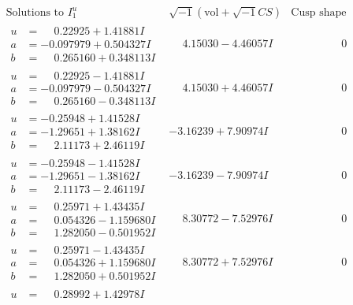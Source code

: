 \documentclass[1p]{elsarticle_modified}
\theoremstyle{definition}
\newcommand{\I}{\sqrt{-1}}
\begin{document}
$$\begin{array}{c|c|c}
\text{Solutions to }I^u_{1}& \I (\text{vol} + \sqrt{-1}CS) & \text{Cusp shape}\\
 \hline 
\begin{aligned}
u &= \phantom{-}0.22925 + 1.41881 I \\
a &= -0.097979 + 0.504327 I \\
b &= \phantom{-}0.265160 + 0.348113 I\end{aligned}
 & \phantom{-}4.15030 - 4.46057 I & \phantom{-0.000000 } 0 \\ \hline\begin{aligned}
u &= \phantom{-}0.22925 - 1.41881 I \\
a &= -0.097979 - 0.504327 I \\
b &= \phantom{-}0.265160 - 0.348113 I\end{aligned}
 & \phantom{-}4.15030 + 4.46057 I & \phantom{-0.000000 } 0 \\ \hline\begin{aligned}
u &= -0.25948 + 1.41528 I \\
a &= -1.29651 + 1.38162 I \\
b &= \phantom{-}2.11173 + 2.46119 I\end{aligned}
 & -3.16239 + 7.90974 I & \phantom{-0.000000 } 0 \\ \hline\begin{aligned}
u &= -0.25948 - 1.41528 I \\
a &= -1.29651 - 1.38162 I \\
b &= \phantom{-}2.11173 - 2.46119 I\end{aligned}
 & -3.16239 - 7.90974 I & \phantom{-0.000000 } 0 \\ \hline\begin{aligned}
u &= \phantom{-}0.25971 + 1.43435 I \\
a &= \phantom{-}0.054326 - 1.159680 I \\
b &= \phantom{-}1.282050 - 0.501952 I\end{aligned}
 & \phantom{-}8.30772 - 7.52976 I & \phantom{-0.000000 } 0 \\ \hline\begin{aligned}
u &= \phantom{-}0.25971 - 1.43435 I \\
a &= \phantom{-}0.054326 + 1.159680 I \\
b &= \phantom{-}1.282050 + 0.501952 I\end{aligned}
 & \phantom{-}8.30772 + 7.52976 I & \phantom{-0.000000 } 0 \\ \hline\begin{aligned}
u &= \phantom{-}0.28992 + 1.42978 I \\

\end{aligned}
\end{array}$$
\end{document}
